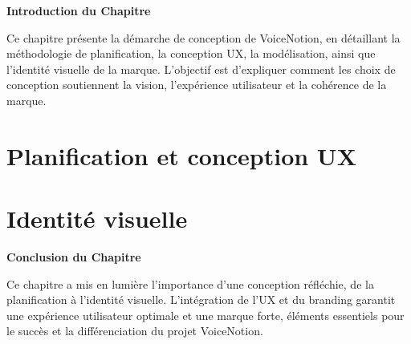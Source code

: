 
\begin{center}
\textbf{\large Introduction du Chapitre}
\end{center}

\noindent
Ce chapitre présente la démarche de conception de VoiceNotion, en détaillant la méthodologie de planification, la conception UX, la modélisation, ainsi que l'identité visuelle de la marque. L'objectif est d'expliquer comment les choix de conception soutiennent la vision, l'expérience utilisateur et la cohérence de la marque.

\section{Planification et conception UX}


\section{Identité visuelle}


\vspace{1cm}
\begin{center}
\textbf{\large Conclusion du Chapitre}
\end{center}

\noindent
Ce chapitre a mis en lumière l'importance d'une conception réfléchie, de la planification à l'identité visuelle. L'intégration de l'UX et du branding garantit une expérience utilisateur optimale et une marque forte, éléments essentiels pour le succès et la différenciation du projet VoiceNotion.
